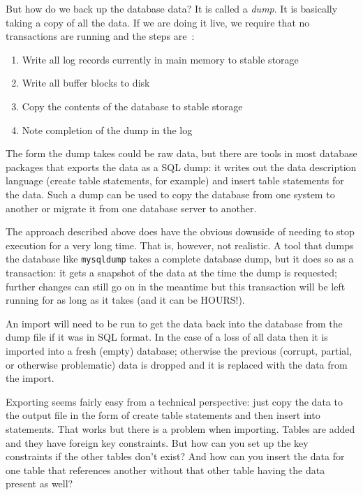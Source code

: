 But how do we back up the database data? It is called a \textit{dump}. It is basically taking a copy of all the data. If we are doing it live, we require that no transactions are running and the steps are~\cite{dsc}:

\begin{enumerate}
	\item Write all log records currently in main memory to stable storage
	\item Write all buffer blocks to disk
	\item Copy the contents of the database to stable storage
	\item Note completion of the dump in the log
\end{enumerate}

The form the dump takes could be raw data, but there are tools in most database packages that exports the data as a SQL dump: it writes out the data description language (create table statements, for example) and insert table statements for the data. Such a dump can be used to copy the database from one system to another or migrate it from one database server to another.

The approach described above does have the obvious downside of needing to stop execution for a very long time. That is, however, not realistic. A tool that dumps the database like \texttt{mysqldump} takes a complete database dump, but it does so as a transaction: it gets a snapshot of the data at the time the dump is requested; further changes can still go on in the meantime but this transaction will be left running for as long as it takes (and it can be HOURS!).

An import will need to be run to get the data back into the database from the dump file if it was in SQL format. In the case of a loss of all data then it is imported into a fresh (empty) database; otherwise the previous (corrupt, partial, or otherwise problematic) data is dropped and it is replaced with the data from the import.

Exporting seems fairly easy from a technical perspective: just copy the data to the output file in the form of create table statements and then insert into statements. That works but there is a problem when importing. Tables are added and they have foreign key constraints. But how can you set up the key constraints if the other tables don't exist? And how can you insert the data for one table that references another without that other table having the data present as well?

